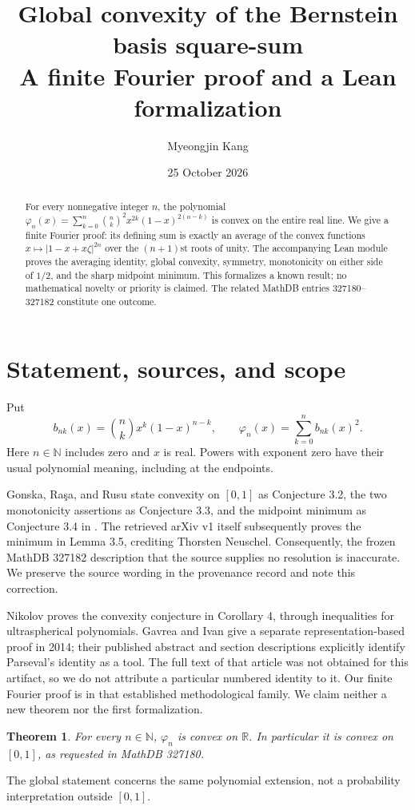 \documentclass[11pt]{article}
\title{Global convexity of the Bernstein basis square-sum\\
\large A finite Fourier proof and a Lean formalization}
\author{Myeongjin Kang}
\date{25 October 2026}
\newtheorem{theorem}{Theorem}
\newcommand{\R}{\mathbb R}
\newcommand{\N}{\mathbb N}
\newcommand{\ph}{\varphi}
\begin{document}
\maketitle
\begin{abstract}
For every nonnegative integer $n$, the polynomial
$\ph_n(x)=\sum_{k=0}^n\binom nk^2x^{2k}(1-x)^{2(n-k)}$
is convex on the entire real line. We give a finite Fourier proof: its defining
sum is exactly an average of the convex functions
$x\mapsto |1-x+x\zeta|^{2n}$ over the $(n+1)$st roots of unity.
The accompanying Lean module proves the averaging identity, global convexity,
symmetry, monotonicity on either side of $1/2$, and the sharp midpoint minimum.
This formalizes a known result; no mathematical novelty or priority is claimed.
The related MathDB entries 327180--327182 constitute one outcome.
\end{abstract}

\section{Statement, sources, and scope}
Put
\[
 b_{nk}(x)=\binom nk x^k(1-x)^{n-k},\qquad
 \ph_n(x)=\sum_{k=0}^n b_{nk}(x)^2 .
\]
Here $n\in\N$ includes zero and $x$ is real. Powers with exponent zero
have their usual polynomial meaning, including at the endpoints.

Gonska, Ra\c{s}a, and Rusu state convexity on $[0,1]$ as Conjecture 3.2,
the two monotonicity assertions as Conjecture 3.3, and the midpoint minimum
as Conjecture 3.4 in \cite{GRR}. The retrieved arXiv v1 itself subsequently
proves the minimum in Lemma 3.5, crediting Thorsten Neuschel. Consequently,
the frozen MathDB 327182 description that the source supplies no resolution
is inaccurate. We preserve the source wording in the provenance record and note this correction.

Nikolov \cite{Nikolov} proves the convexity conjecture in Corollary 4,
through inequalities for ultraspherical polynomials. Gavrea and Ivan
\cite{GI} give a separate representation-based proof in 2014; their
published abstract and section descriptions explicitly identify Parseval's
identity as a tool. The full text of that article was not obtained for this
artifact, so we do not attribute a particular numbered identity to it.
Our finite Fourier proof is in that established methodological family.
We claim neither a new theorem nor the first formalization.

\begin{theorem}\label{thm:main}
For every $n\in\N$, $\ph_n$ is convex on $\R$. In particular it is
convex on $[0,1]$, as requested in MathDB 327180.
\end{theorem}
The global statement concerns the same polynomial extension, not a
probability interpretation outside $[0,1]$.
\end{document}
